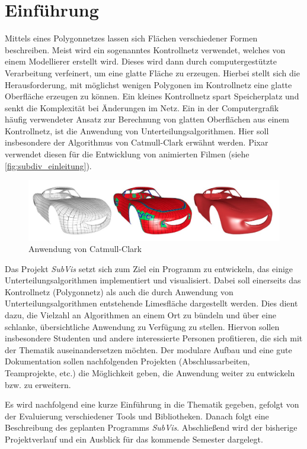 \chapter{Einführung}

Mittels eines Polygonnetzes lassen sich Flächen verschiedener Formen beschreiben. 
Meist wird ein sogenanntes Kontrollnetz verwendet, welches von einem Modellierer erstellt wird.
Dieses wird dann durch computergestützte Verarbeitung verfeinert, um eine glatte Fläche zu erzeugen.
Hierbei stellt sich die Herausforderung, mit möglichst wenigen Polygonen im Kontrollnetz eine glatte Oberfläche erzeugen zu können.
Ein kleines Kontrollnetz spart Speicherplatz und senkt die Komplexität bei Änderungen im Netz.
Ein in der Computergrafik häufig verwendeter Ansatz zur Berechnung von glatten Oberflächen aus einem Kontrollnetz, ist die Anwendung von Unterteilungsalgorithmen.
Hier soll insbesondere der Algorithmus von Catmull-Clark erwähnt werden.
Pixar verwendet diesen für die Entwicklung von animierten Filmen (siehe \autoref{fig:subdiv_einleitung}).

\begin{figure}
  \centering
  \includegraphics[width=\textwidth]{content/media/sd_einleitung.jpg}
  \caption{Anwendung von Catmull-Clark \cite{niessner2012feature}}
  \label{fig:subdiv_einleitung}
\end{figure}


Das Projekt \emph{SubVis} setzt sich zum Ziel ein Programm zu entwickeln, das einige Unterteilungsalgorithmen implementiert und visualisiert. 
Dabei soll einerseits das Kontrollnetz (Polygonnetz) als auch die durch Anwendung von Unterteilungsalgorithmen entstehende Limesfläche dargestellt werden.
Dies dient dazu, die Vielzahl an Algorithmen an einem Ort zu bündeln und über eine schlanke, übersichtliche Anwendung zu Verfügung zu stellen.
Hiervon sollen insbesondere Studenten und andere interessierte Personen profitieren, die sich mit der Thematik auseinandersetzen möchten.
Der modulare Aufbau und eine gute Dokumentation sollen nachfolgenden Projekten (Abschlussarbeiten, Teamprojekte, etc.) die Möglichkeit geben, die Anwendung weiter zu entwickeln bzw. zu erweitern.

Es wird nachfolgend eine kurze Einführung in die Thematik gegeben, gefolgt von der Evaluierung verschiedener Tools und Bibliotheken. 
Danach folgt eine Beschreibung des geplanten Programms \emph{SubVis}.
Abschließend wird der bisherige Projektverlauf und ein Ausblick für das kommende Semester dargelegt.